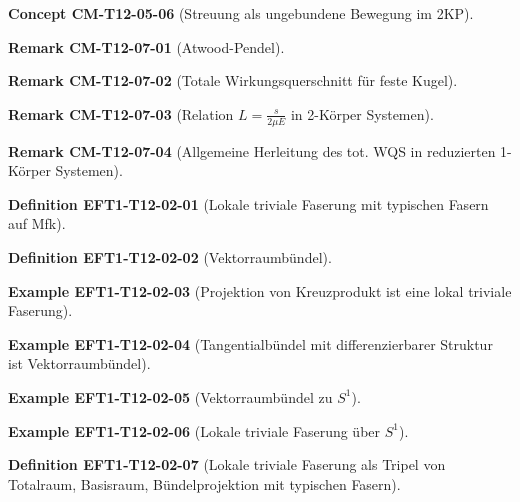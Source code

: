 \documentclass[10pt, letterpaper]{article}
\newcommand{\CustomHeading}[3]{%
  \par\medskip\noindent%
  \textbf{#1 #2} \textnormal{(#3)}.\enskip%
}
\newenvironment{DEF}[2]{\CustomHeading{Definition}{#1}{#2}}{}
\newenvironment{REM}[2]{\CustomHeading{Remark}{#1}{#2}}{}
\newenvironment{EXA}[2]{\CustomHeading{Example}{#1}{#2}}{}
\newenvironment{CONC}[2]{\CustomHeading{Concept}{#1}{#2}}{}
\begin{document}
\begin{CONC}{CM-T12-05-06}{Streuung als ungebundene Bewegung im 2KP}
\end{CONC}

\begin{REM}{CM-T12-07-01}{Atwood-Pendel}
\end{REM}

\begin{REM}{CM-T12-07-02}{Totale Wirkungsquerschnitt für feste Kugel}
\end{REM}

\begin{REM}{CM-T12-07-03}{Relation $L = \frac{s}{2\mu E}$ in 2-Körper Systemen}
\end{REM}

\begin{REM}{CM-T12-07-04}{Allgemeine Herleitung des tot. WQS in reduzierten 1-Körper Systemen}
\end{REM}

\begin{DEF}{EFT1-T12-02-01}{Lokale triviale Faserung mit typischen Fasern auf Mfk}
\end{DEF}

\begin{DEF}{EFT1-T12-02-02}{Vektorraumbündel}
\end{DEF}

\begin{EXA}{EFT1-T12-02-03}{Projektion von Kreuzprodukt ist eine lokal triviale Faserung}
\end{EXA}

\begin{EXA}{EFT1-T12-02-04}{Tangentialbündel mit differenzierbarer Struktur ist Vektorraumbündel}
\end{EXA}

\begin{EXA}{EFT1-T12-02-05}{Vektorraumbündel zu $S^1$}
\end{EXA}

\begin{EXA}{EFT1-T12-02-06}{Lokale triviale Faserung über $S^1$}
\end{EXA}

\begin{DEF}{EFT1-T12-02-07}{Lokale triviale Faserung als Tripel von Totalraum, Basisraum, Bündelprojektion mit typischen Fasern}
\end{DEF}
\end{document}
